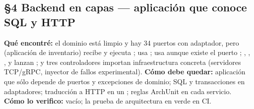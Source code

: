 \subsection*{\S4 Backend en capas --- aplicaci\'on que conoce SQL y HTTP}
\textbf{Qu\'e encontr\'e:} el dominio est\'a limpio y hay 34 puertos con adaptador, pero  (aplicaci\'on de inventario) recibe  y ejecuta ;  usa ;  usa  aunque existe el puerto ; , , ,  y  lanzan ; y tres controladores importan infraestructura concreta (servidores TCP/gRPC, inyector de fallos experimental). \textbf{C\'omo debe quedar:} aplicaci\'on que s\'olo depende de puertos y excepciones de dominio; SQL y transacciones en adaptadores; traducci\'on a HTTP en un ; reglas ArchUnit en cada servicio. \textbf{C\'omo lo verifico:}  vac\'io; la prueba de arquitectura en verde en CI.

